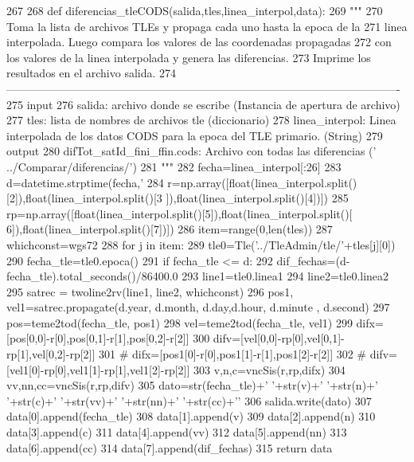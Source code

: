 \begin{DoxyCode}
267 
268 def diferencias_tleCODS(salida,tles,linea_interpol,data):
269     """
270     Toma la lista de archivos TLEs y propaga cada uno hasta la epoca de la
271     linea interpolada. Luego compara los valores de las coordenadas propagadas
272     con los valores de la linea interpolada y genera las diferencias. 
273     Imprime los resultados en el archivo salida.     
274    
       ----------------------------------------------------------------------------------------------------------
275     input
276         salida: archivo donde se escribe (Instancia de apertura de archivo)
277         tles: lista de nombres de archivos tle (diccionario)
278         linea_interpol: Linea interpolada de los datos CODS para la epoca del
       TLE primario. (String)
279     output
280         difTot_satId_fini_ffin.cods: Archivo con todas las diferencias ('
      ../Comparar/diferencias/')
281     """
282     fecha=linea_interpol[:26]
283     d=datetime.strptime(fecha,'%
284     r=np.array([float(linea_interpol.split()[2]),float(linea_interpol.split()[3
      ]),float(linea_interpol.split()[4])])
285     rp=np.array([float(linea_interpol.split()[5]),float(linea_interpol.split()[
      6]),float(linea_interpol.split()[7])])
286     item=range(0,len(tles))
287     whichconst=wgs72
288     for j in item:
289         tle0=Tle('../TleAdmin/tle/'+tles[j][0])
290         fecha_tle=tle0.epoca()
291         if fecha_tle <= d:
292             dif_fechas=(d-fecha_tle).total_seconds()/86400.0
293             line1=tle0.linea1
294             line2=tle0.linea2
295             satrec = twoline2rv(line1, line2, whichconst)
296             pos1, vel1=satrec.propagate(d.year, d.month, d.day,d.hour, d.minute
      , d.second)
297             pos=teme2tod(fecha_tle, pos1)
298             vel=teme2tod(fecha_tle, vel1)
299             difx=[pos[0,0]-r[0],pos[0,1]-r[1],pos[0,2]-r[2]]
300             difv=[vel[0,0]-rp[0],vel[0,1]-rp[1],vel[0,2]-rp[2]]
301 #             difx=[pos1[0]-r[0],pos1[1]-r[1],pos1[2]-r[2]]
302 #             difv=[vel1[0]-rp[0],vel1[1]-rp[1],vel1[2]-rp[2]]
303             v,n,c=vncSis(r,rp,difx)
304             vv,nn,cc=vncSis(r,rp,difv)
305             dato=str(fecha_tle)+' '+str(v)+' '+str(n)+' '+str(c)+' '+str(vv)+' 
      '+str(nn)+' '+str(cc)+'\n'
306             salida.write(dato)
307             data[0].append(fecha_tle)
308             data[1].append(v)
309             data[2].append(n)
310             data[3].append(c)
311             data[4].append(vv)
312             data[5].append(nn)
313             data[6].append(cc)
314             data[7].append(dif_fechas)
315     return data

\end{DoxyCode}


